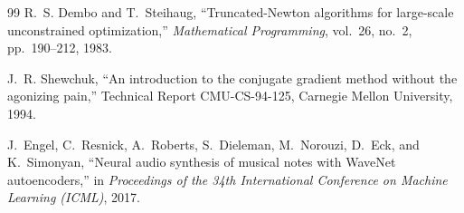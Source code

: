 \documentclass[italian, a4paper, twoside, binding=6mm]{sapthesis}
\begin{document}
\begin{thebibliography}{99}
R.~S. Dembo and T.~Steihaug,
``Truncated-Newton algorithms for large-scale unconstrained optimization,''
\textit{Mathematical Programming}, vol.~26, no.~2, pp.~190--212, 1983.

J.~R. Shewchuk,
``An introduction to the conjugate gradient method without the agonizing
pain,''
Technical Report CMU-CS-94-125, Carnegie Mellon University, 1994.

J.~Engel, C.~Resnick, A.~Roberts, S.~Dieleman, M.~Norouzi, D.~Eck, and
K.~Simonyan,
``Neural audio synthesis of musical notes with WaveNet autoencoders,''
in \textit{Proceedings of the 34th International Conference on Machine
Learning (ICML)}, 2017.

\end{thebibliography}
\end{document}
